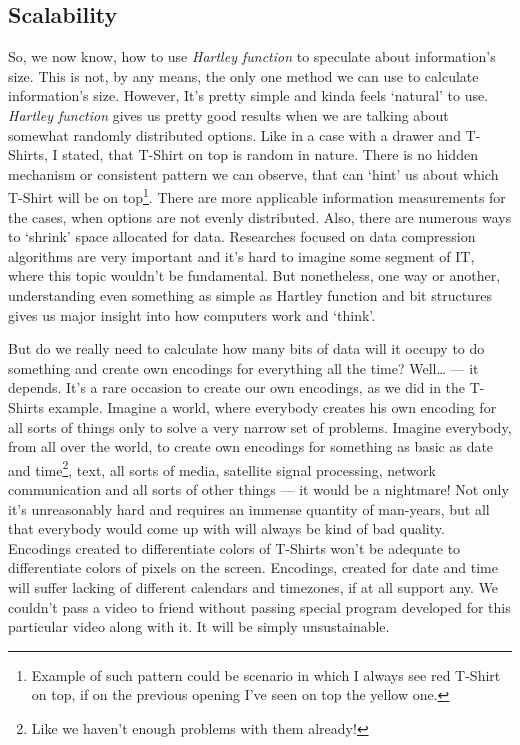 \documentclass{report}
\begin{document}
            \subsection{Scalability}
            So, we now know, how to use \emph{Hartley function} to speculate about information's size. This is not, by any means, the only one method we can use to 
            calculate information's size. However, It's pretty simple and kinda feels `natural' to use. \emph{Hartley function} gives us pretty good results when we are talking
            about somewhat randomly distributed options. Like in a case with a drawer and T-Shirts, I stated, that T-Shirt on top is random in nature. There is no 
            hidden mechanism or consistent pattern we can observe, that can `hint' us about which T-Shirt will be on top\footnote{Example of such pattern could
            be scenario in which I always see red T-Shirt on top, if on   the previous opening I've seen on top the yellow one.}. There are more applicable information 
            measurements for the cases, when options are not evenly distributed. Also, there are numerous ways to `shrink' space allocated for data. Researches focused
            on data compression algorithms are very important and it's hard to imagine some segment of IT, where this topic wouldn't be fundamental. But nonetheless, 
            one way or another, understanding even something as simple as Hartley function and bit structures gives us major insight into how computers work and `think'. \par

            But do we really need to calculate how many bits of data will it occupy to do something and create own encodings for everything all the time? Well\ldots{} --- it depends. 
            It's a rare occasion to create our own encodings, as we did in the T-Shirts example. Imagine a world, where everybody creates his own encoding for all 
            sorts of things only to solve a very narrow set of problems. Imagine everybody, from all over the world, to create own encodings for something as basic
            as date and time\footnote{Like we haven't enough problems with them already!}, text, all sorts of media, satellite signal processing, network communication and all
            sorts of other things --- it would be a nightmare! Not only it's unreasonably hard and requires an immense quantity of man-years, but all that everybody would 
            come up with will always be kind of bad quality. Encodings created to differentiate colors of T-Shirts won't be adequate to differentiate colors of pixels on 
            the screen. Encodings, created for date and time will suffer lacking of different calendars and timezones, if at all support any. We couldn't pass a video to 
            friend without passing special program developed for this particular video along with it. It will be simply unsustainable. \par
\end{document}
